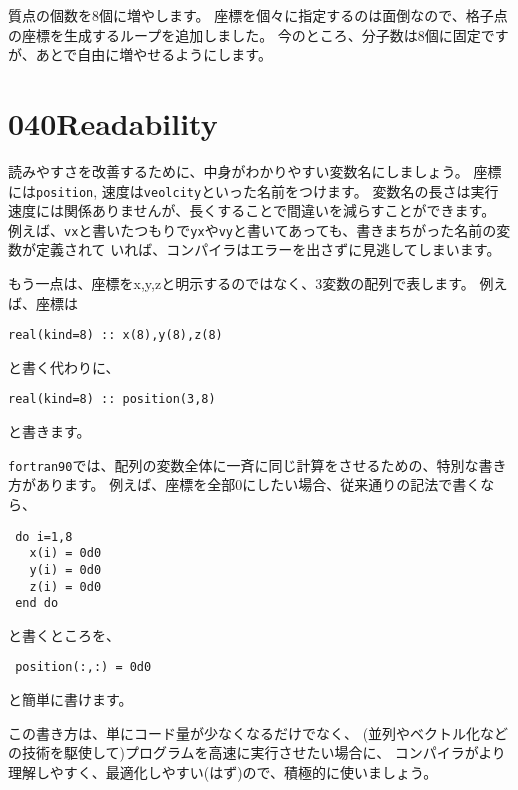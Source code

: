 \documentclass[a4,10pt]{article}
\begin{document}
質点の個数を8個に増やします。
座標を個々に指定するのは面倒なので、格子点の座標を生成するループを追加しました。
今のところ、分子数は8個に固定ですが、あとで自由に増やせるようにします。


\section{040Readability}

読みやすさを改善するために、中身がわかりやすい変数名にしましょう。
座標には{\tt position}, 速度は{\tt veolcity}といった名前をつけます。
変数名の長さは実行速度には関係ありませんが、長くすることで間違いを減らすことができます。
例えば、{\tt vx}と書いたつもりで{\tt yx}や{\tt vy}と書いてあっても、書きまちがった名前の変数が定義されて
いれば、コンパイラはエラーを出さずに見逃してしまいます。

もう一点は、座標をx,y,zと明示するのではなく、3変数の配列で表します。
例えば、座標は
\begin{screen}\begin{verbatim}
real(kind=8) :: x(8),y(8),z(8)
\end{verbatim}\end{screen}
と書く代わりに、
\begin{screen}\begin{verbatim}
real(kind=8) :: position(3,8)
\end{verbatim}\end{screen}
と書きます。

{\tt fortran90}では、配列の変数全体に一斉に同じ計算をさせるための、特別な書き方があります。
例えば、座標を全部0にしたい場合、従来通りの記法で書くなら、
\begin{screen}\begin{verbatim}
 do i=1,8
   x(i) = 0d0
   y(i) = 0d0
   z(i) = 0d0
 end do
\end{verbatim}\end{screen}
と書くところを、
\begin{screen}\begin{verbatim}
 position(:,:) = 0d0
\end{verbatim}\end{screen}
と簡単に書けます。

この書き方は、単にコード量が少なくなるだけでなく、
(並列やベクトル化などの技術を駆使して)プログラムを高速に実行させたい場合に、
コンパイラがより理解しやすく、最適化しやすい(はず)ので、積極的に使いましょう。
\end{document}
